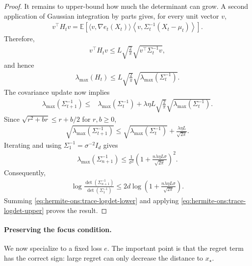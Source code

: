\documentclass{article}
\theoremstyle{plain}
\theoremstyle{definition}
\theoremstyle{plain}
\newcommand{\E}{\mathbb E}
\begin{document}
\begin{proof}
    It remains to upper-bound how much the determinant can grow.
    A second application of Gaussian integration by parts gives, for
    every unit vector $v$,
    \begin{align}
        v^\top H_tv
        =
        \E\left[
            \langle v,\nabla e_t(X_t)\rangle
            \left\langle
            v,\Sigma_t^{-1}(X_t-\mu_t)
            \right\rangle
            \right].
    \end{align}
    Therefore,
    \begin{align}
        v^\top H_tv
        \leq
        L\sqrt{\frac{2}{\pi}}
        \sqrt{v^\top\Sigma_t^{-1}v},
    \end{align}
    and hence
    \begin{align}
        \lambda_{\max}(H_t)
        \leq
        L\sqrt{\frac{2}{\pi}}
        \sqrt{\lambda_{\max}(\Sigma_t^{-1})}.
        \label{eq:hermite-ons:hessian-operator}
    \end{align}
    The covariance update now implies
    \begin{align}
        \lambda_{\max}(\Sigma_{t+1}^{-1})
        \leq{} &
        \lambda_{\max}(\Sigma_t^{-1})
        +
        \lambda\eta L\sqrt{\frac{2}{\pi}}
        \sqrt{\lambda_{\max}(\Sigma_t^{-1})}.
    \end{align}
    Since $\sqrt{r^2+br}\leq r+b/2$ for $r,b\geq0$,
    \begin{align}
        \sqrt{\lambda_{\max}(\Sigma_{t+1}^{-1})}
        \leq
        \sqrt{\lambda_{\max}(\Sigma_t^{-1})}
        +
        \frac{\lambda\eta L}{\sqrt{2\pi}}.
    \end{align}
    Iterating and using $\Sigma_1^{-1}=\sigma^{-2}I_d$ gives
    \begin{align}
        \lambda_{\max}(\Sigma_{n+1}^{-1})
        \leq
        \frac{1}{\sigma^2}
        \left(
        1+\frac{n\lambda\eta L\sigma}{\sqrt{2\pi}}
        \right)^2.
    \end{align}
    Consequently,
    \begin{align}
        \log\frac{\det(\Sigma_{n+1}^{-1})}
        {\det(\Sigma_1^{-1})}
        \leq
        2d\log\left(
        1+\frac{n\lambda\eta L\sigma}{\sqrt{2\pi}}
        \right).
        \label{eq:hermite-ons:trace-logdet-upper}
    \end{align}
    Summing \eqref{eq:hermite-ons:trace-logdet-lower} and applying
    \eqref{eq:hermite-ons:trace-logdet-upper} proves the result.
\end{proof}


\paragraph{Preserving the focus condition.}
We now specialize to a fixed loss $e$. The important point is that
the regret term has the correct sign: large regret can only decrease
the distance to $x_\star$.
\end{document}
